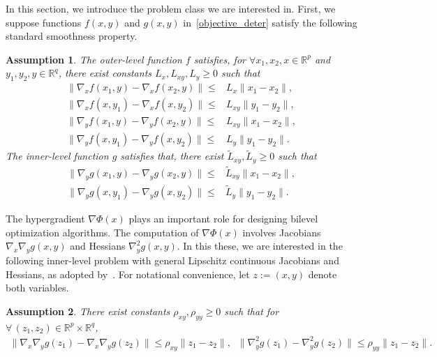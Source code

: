 \documentclass{osudissert96}
\newtheorem{assum}{Assumption}
\begin{document}
In this section, we introduce the problem class we are interested in. First, we suppose functions $f(x,y)$ and $g(x,y)$ in~\cref{objective_deter} satisfy the following standard smoothness property. 
\begin{assum}\label{fg:smooth}
The outer-level function $f$ satisfies, for $\forall x_1,x_2,x\in\mathbb{R}^p$ and $y_1,y_2,y\in\mathbb{R}^q$, there exist constants $L_x,L_{xy},L_y\geq 0$ such that
 \begin{align}\label{def:first}
\| \nabla_x  f(x_1,y)-\nabla_x f(x_2,y)\| \leq &L_x \|x_1-x_2\|, \nonumber
\\\| \nabla_x  f(x,y_1)-\nabla_x f(x,y_2)\| \leq& L_{xy} \|y_1-y_2\|, \nonumber
\\\| \nabla_y  f(x_1,y)-\nabla_y f(x_2,y)\| \leq &L_{xy} \|x_1-x_2\|, \nonumber
\\\| \nabla_y  f(x,y_1)-\nabla_y f(x,y_2)\| \leq &L_{y} \|y_1-y_2\|.
\end{align}
The inner-level function $g$ satisfies that, there exist $\widetilde L_{xy},\widetilde L_{y}\geq 0$ such that 
\begin{align}\label{df:sec} 
\| \nabla_y  g(x_1,y)-\nabla_y g(x_2,y)\| \leq &\widetilde L_{xy} \|x_1-x_2\|, \nonumber
\\\| \nabla_y  g(x,y_1)-\nabla_y g(x,y_2)\| \leq &\widetilde L_{y} \|y_1-y_2\|.
\end{align}
\end{assum}
The hypergradient $\nabla \Phi(x)$ plays an important role for designing bilevel optimization algorithms. The computation of $\nabla\Phi(x)$ involves Jacobians $\nabla_x\nabla_y g(x,y)$ and Hessians $\nabla_y^2 g(x,y)$. In this these, we are interested in the following inner-level problem with general Lipschitz continuous  Jacobians and Hessians, as adopted by~\cite{ghadimi2018approximation,ji2020bilevel,hong2020two}. For notational convenience, let $z:=(x,y)$ denote both variables.  
\begin{assum}\label{g:hessiansJaco}
There exist constants $\rho_{xy},\rho_{yy}\geq 0$ such that for $\forall\,(z_1,z_2)\in\mathbb{R}^p \times \mathbb{R}^q$, 
{\small
\begin{align}\label{def:three}
\|\nabla_x\nabla_y g(z_1)-\nabla_x\nabla_y g(z_2)\| \leq \rho_{xy}\|z_1-z_2\|,\;\; \|\nabla^2_y g(z_1)-\nabla_y^2 g(z_2)\| \leq \rho_{yy}\|z_1-z_2\|. 
\end{align} }
\end{assum} %
\end{document}
